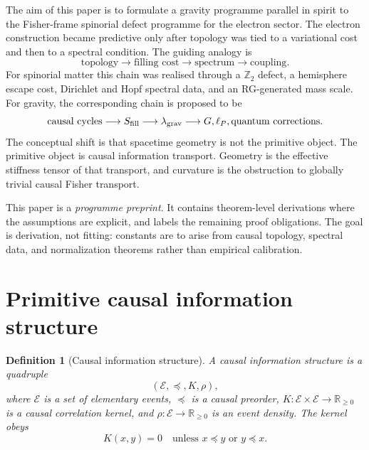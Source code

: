\documentclass[11pt]{article}
\newtheorem{definition}{Definition}[section]
\newcommand{\E}{\mathcal E}
\newcommand{\pre}{\preceq}
\begin{document}
The aim of this paper is to formulate a gravity programme parallel in spirit to the Fisher-frame spinorial defect programme for the electron sector. The electron construction became predictive only after topology was tied to a variational cost and then to a spectral condition. The guiding analogy is
\begin{equation}
\text{topology}\longrightarrow \text{filling cost}\longrightarrow \text{spectrum}\longrightarrow \text{coupling}.
\end{equation}
For spinorial matter this chain was realised through a $\mathbb Z_2$ defect, a hemisphere escape cost, Dirichlet and Hopf spectral data, and an RG-generated mass scale. For gravity, the corresponding chain is proposed to be
\begin{equation}
\text{causal cycles}\longrightarrow S_{\rm fill}\longrightarrow \lambda_{\rm grav}\longrightarrow G,\ell_P,\text{quantum corrections}.
\end{equation}
The conceptual shift is that spacetime geometry is not the primitive object. The primitive object is causal information transport. Geometry is the effective stiffness tensor of that transport, and curvature is the obstruction to globally trivial causal Fisher transport.

This paper is a \emph{programme preprint}. It contains theorem-level derivations where the assumptions are explicit, and labels the remaining proof obligations. The goal is derivation, not fitting: constants are to arise from causal topology, spectral data, and normalization theorems rather than empirical calibration.

\section{Primitive causal information structure}

\begin{definition}[Causal information structure]
A causal information structure is a quadruple
\begin{equation}
(\E,\pre,K,\rho),
\end{equation}
where $\E$ is a set of elementary events, $\pre$ is a causal preorder, $K:\E\times\E\to\mathbb R_{\ge0}$ is a causal correlation kernel, and $\rho:\E\to\mathbb R_{\ge0}$ is an event density. The kernel obeys
\begin{equation}
K(x,y)=0 \quad \text{unless } x\pre y \text{ or } y\pre x.
\end{equation}
\end{definition}
\end{document}
